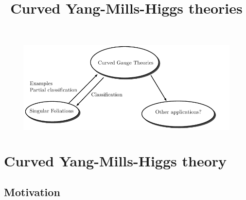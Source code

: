 \documentclass[
aspectratio=3218, 
10pt, hyperref={pdfpagelabels=false}]{beamer}
\title{Curved Yang-Mills-Higgs theories}
\subtitle{}
\author{Simon-Raphael Fischer, \textit{based on joint works with Camille Laurent-Gengoux, and with Mehran Jalali Farahani, Hyungrok Kim (\begin{CJK*}{UTF8}{bkai}金炯錄\end{CJK*}), Christian Sämann}}
\institute{
\begin{figure}
	\centering
		\texttt{[image: Logo\_Uni\_Göttingen\_2022.png]}
	\label{fig:NCTS}
\end{figure}
\begin{center}
\end{center}
}
\date{}
\theoremstyle{plain}
\theoremstyle{remark}
\begin{document}
\begin{frame}
\thispagestyle{empty}
\titlepage
\end{frame} 


{
\begin{frame}
\thispagestyle{empty}
\begin{figure}[htbp]
	\centering
		\includegraphics[width=1\textwidth]{Research circles I.pdf}
\end{figure}
\end{frame} 
}

\section{Curved Yang-Mills-Higgs theory}

\subsection{Motivation}
\end{document}

